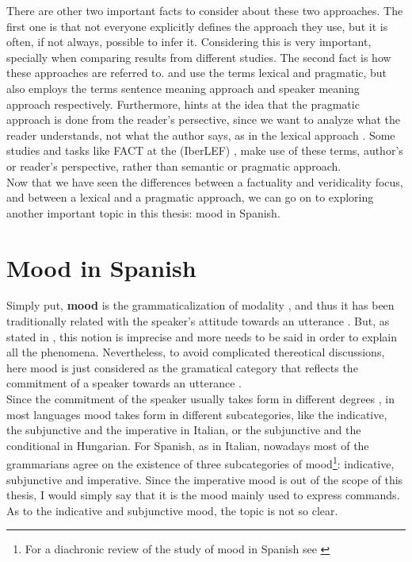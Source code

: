 There are other two important facts to consider about these two approaches. The first one is that not everyone explicitly defines the approach they use, but it is often, if not always, possible to infer it. Considering this is very important, specially when comparing results from different studies. The second fact is how these approaches are referred to. \citet{de2012did} and \citet{ross2019well} use the terms lexical and pragmatic, but \citet{ross2019well} also employs the terms sentence meaning approach and speaker meaning approach respectively. Furthermore, \citet{de2012did} hints at the idea that the pragmatic approach is done from the reader's persective, since we want to analyze what the reader understands, not what the author says, as in the lexical approach \citep{sauri2009factbank}. Some studies and tasks like FACT at the  (IberLEF) \citep{rosa2019overview}, make use of these terms, author's or reader's perspective, rather than semantic or pragmatic approach.\\

Now that we have seen the differences between a factuality and veridicality focus, and between a lexical and a pragmatic approach, we can go on to exploring another important topic in this thesis: mood in Spanish.\\

\section{Mood in Spanish}
\label{sect:spamood}

Simply put, \textbf{mood} is the grammaticalization of modality \citep{lyons1995linguistic,sanchez2011aproximacion}, and thus it has been traditionally related with the speaker's attitude towards an utterance \citep{lyons1995linguistic,espanola2010nueva}. But, as stated in \citet{espanola2010nueva}, this notion is imprecise and more needs to be said in order to explain all the phenomena. Nevertheless, to avoid complicated thereotical discussions, here mood is just considered as the gramatical category that reflects the commitment of a speaker towards an utterance \citep{espanola2010nueva}.\\

Since the commitment of the speaker usually takes form in different degrees \citep{lyons1995linguistic}, in most languages mood takes form in different subcategories, like the indicative, the subjunctive and the imperative in Italian, or the subjunctive and the conditional in Hungarian. For Spanish, as in Italian, nowadays most of the grammarians agree on the existence of three subcategories of mood\footnote{For a diachronic review of the study of mood in Spanish see \citet{calvo1995modo}}: indicative, subjunctive and imperative. Since the imperative mood is out of the scope of this thesis, I would simply say that it is the mood mainly used to express commands. As to the indicative and subjunctive mood, the topic is not so clear.\\

